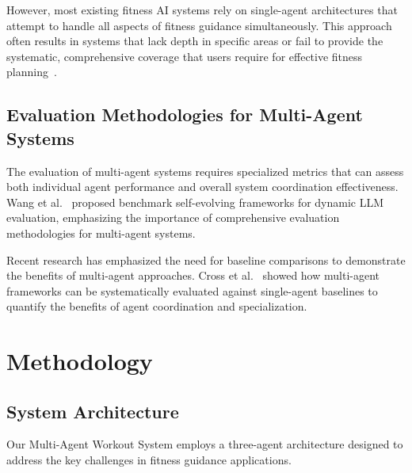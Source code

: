 \documentclass[conference]{IEEEtran}
\begin{document}
However, most existing fitness AI systems rely on single-agent architectures that attempt to handle all aspects of fitness guidance simultaneously. This approach often results in systems that lack depth in specific areas or fail to provide the systematic, comprehensive coverage that users require for effective fitness planning~\cite{smartfit2024, fitnessguide2024}.

\subsection{Evaluation Methodologies for Multi-Agent Systems}

The evaluation of multi-agent systems requires specialized metrics that can assess both individual agent performance and overall system coordination effectiveness. Wang et al.~\cite{benchmarkevolving2024} proposed benchmark self-evolving frameworks for dynamic LLM evaluation, emphasizing the importance of comprehensive evaluation methodologies for multi-agent systems.

Recent research has emphasized the need for baseline comparisons to demonstrate the benefits of multi-agent approaches. Cross et al.~\cite{hypotheticalminds2024} showed how multi-agent frameworks can be systematically evaluated against single-agent baselines to quantify the benefits of agent coordination and specialization.

\section{Methodology}

\subsection{System Architecture}

Our Multi-Agent Workout System employs a three-agent architecture designed to address the key challenges in fitness guidance applications.
\end{document}
